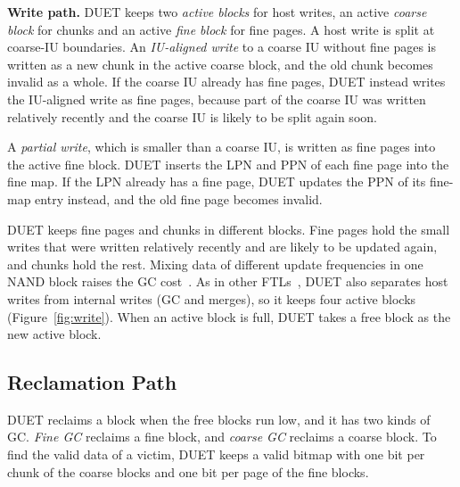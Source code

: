\textbf{Write path.} DUET keeps two \emph{active blocks} for host writes, an active
\emph{coarse block} for chunks and an active \emph{fine block} for fine pages.
A host write
is split at coarse-IU boundaries. An \emph{IU-aligned write} to a coarse IU without fine pages is written as a new chunk
in the active coarse block, and the old chunk becomes invalid as a whole. If the coarse IU
already has fine pages, DUET instead writes the IU-aligned write as fine pages,
because part of the coarse IU was written relatively recently and the coarse IU is
likely to be split again soon.

A \emph{partial write}, which is smaller than a coarse IU, is written as fine
pages into the active fine block. DUET inserts the LPN and PPN of each fine page into
the fine map. If the
LPN already has a
fine page, DUET updates the PPN of its fine-map entry instead, and the old fine
page becomes invalid.

DUET keeps fine pages and chunks in different blocks. Fine pages hold the small writes
that were written relatively recently and are likely to be updated again, and chunks hold the rest.
Mixing data of different update
frequencies in one NAND block raises the GC cost~\cite{hotcold,dwf,multistream}.
As in other FTLs~\cite{fast,sepbit,midas,dogi}, DUET also separates host writes from internal
writes (GC and merges), so it keeps four active blocks (Figure~\ref{fig:write}).
When an active block is full, DUET takes a free block as the new active block.

\subsection{Reclamation Path}
\label{sec:reclaim}
DUET reclaims a block when the free blocks run low, and it has two kinds of GC. \emph{Fine GC} reclaims a fine block, and
\emph{coarse GC} reclaims a coarse block. To find the valid data of a victim,
DUET keeps a valid bitmap with one bit per chunk of the coarse blocks and
one bit per page of the fine blocks.

